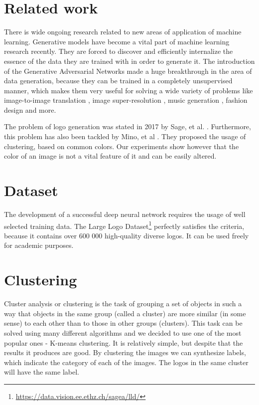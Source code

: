\documentclass{article}
\begin{document}
\section{Related work}
There is wide ongoing research related to new areas of application of machine learning. Generative models have become a vital part of machine learning research recently. They are forced to discover and efficiently internalize the essence of the data they are trained with in order to generate it. The introduction of the Generative Adversarial Networks \cite{goodfellow2014generative} made a huge breakthrough in the area of data generation, because they can be trained in a completely unsupervised manner, which makes them very useful for solving a wide variety of problems like image-to-image translation \cite{isola2016imagetoimage}, image super-resolution \cite{ledig2016photorealistic}, music generation \cite{yang2017midinet}, fashion design \cite{article} and more.

The problem of logo generation was stated in 2017 by Sage, et al. \cite{alex2017logo}. Furthermore, this problem has also been tackled by Mino, et al \cite{mino2018logan}. They proposed the usage of clustering, based on common colors. Our experiments show however that the color of an image is not a vital feature of it and can be easily altered.

\section{Dataset}
The development of a successful deep neural network requires the usage of well selected training data. The Large Logo Dataset\footnote{ \url{https://data.vision.ee.ethz.ch/sagea/lld/}} perfectly satisfies the criteria, because it contains over 600 000 high-quality diverse logos. It can be used freely for academic purposes.

\section{Clustering}
Cluster analysis or clustering is the task of grouping a set of objects in such a way that objects in the same group (called a cluster) are more similar (in some sense) to each other than to those in other groups (clusters). This task can be solved using many different algorithms and we decided to use one of the most popular ones - K-means clustering. It is relatively simple, but despite that the results it produces are good. By clustering the images we can synthesize labels, which indicate the category of each of the images. The logos in the same cluster will have the same label.
\end{document}
